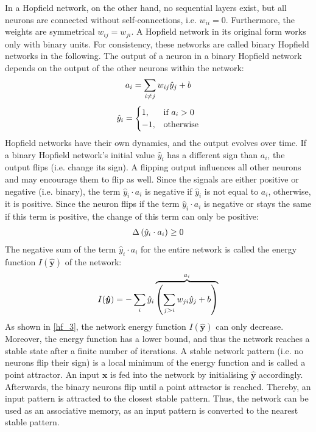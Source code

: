 In a Hopfield network, on the other hand, no sequential layers exist, but all neurons are connected without self-connections, i.e. \(w_{ii}=0\).
Furthermore, the weights are symmetrical \(w_{ij} = w_{ji}\).
A Hopfield network in its original form works only with binary units.
For consistency, these networks are called binary Hopfield networks in the following.
The output of a neuron in a binary Hopfield network depends on the output of the other neurons within the network:
%
\begin{align}\eqlbl{hf_1}
	a_i = \sum_{i \neq j} w_{ij} \hat{y}_j + b
\end{align}
%
\begin{align}\eqlbl{hf_2}
	\hat{y}_i = \begin{cases}
      		1, & \text{if } a_i > 0 \\
      		-1, & \text{otherwise}
    	\end{cases}
\end{align}
%
Hopfield networks have their own dynamics, and the output evolves over time.
If a binary Hopfield network's initial value \(\hat{y}_i\) has a different sign than $a_i$, the output flips (i.e. change its sign).
A flipping output influences all other neurons and may encourage them to flip as well.
Since the signals are either positive or negative (i.e. binary), the term \(\hat{y}_i \cdot a_i\) is negative if \(\hat{y}_i\) is not equal to \(a_i\), otherwise, it is positive.
Since the neuron flips if the term \(\hat{y}_i \cdot a_i\) is negative or stays the same if this term is positive, the change of this term can only be positive:
%
\begin{align}\eqlbl{hf_3}
	\Delta \left( \hat{y}_i \cdot a_i \right) \geq 0
\end{align}
%
The negative sum of the term $\hat{y}_i \cdot a_i$ for the entire network is called the energy function $I(\boldsymbol{\hat{y}})$ of the network:
%
\begin{align}\eqlbl{hf_4}
	I(\boldsymbol{\hat{y}}) = -\sum_{i} \hat{y}_i \overbrace{\left( \sum_{j>i} w_{ji} \hat{y}_j + b \right)}^{a_i}
\end{align}
%
As shown in \eqref{hf_3}, the network energy function \(I(\boldsymbol{\hat{y}})\) can only decrease.
Moreover, the energy function has a lower bound, and thus the network reaches a stable state after a finite number of iterations. 
A stable network pattern (i.e. no neurons flip their sign) is a local minimum of the energy function and is called a point attractor.
An input $\boldsymbol{x}$ is fed into the network by initialising $\boldsymbol{\hat{y}}$ accordingly.
Afterwards, the binary neurons flip until a point attractor is reached. Thereby, an input pattern is attracted to the closest stable pattern.
Thus, the network can be used as an associative memory, as an input pattern is converted to the nearest stable pattern.

